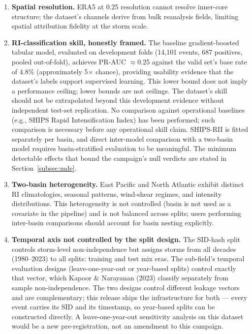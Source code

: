 \documentclass[11pt]{article}
\begin{document}
\begin{enumerate}
  \item \textbf{Spatial resolution.} ERA5 at 0.25\textdegree{} resolution
  cannot resolve inner-core structure; the dataset's channels derive from bulk
  reanalysis fields, limiting spatial attribution fidelity at the storm scale.

  \item \textbf{RI-classification skill, honestly framed.} The baseline
  gradient-boosted tabular model, evaluated on development folds (14{,}101
  events, 687 positives, pooled out-of-fold), achieves PR-AUC $\approx$0.25
  against the valid set's base rate of 4.8\% (approximately 5$\times$ chance),
  providing usability evidence that the dataset's labels support supervised
  learning. This lower bound does not imply a performance ceiling; lower bounds
  are not ceilings. The dataset's skill should not be extrapolated beyond this
  development evidence without independent test-set replication. No comparison
  against operational baselines (e.g., SHIPS Rapid Intensification Index) has
  been performed; such comparison is necessary before any operational skill
  claim. SHIPS-RII is fitted separately per basin, and direct inter-model
  comparison with a two-basin model requires basin-stratified evaluation to be
  meaningful. The minimum detectable effects that bound the campaign's null
  verdicts are stated in Section~\ref{subsec:mde}.

  \item \textbf{Two-basin heterogeneity.} East Pacific and North Atlantic
  exhibit distinct RI climatologies, seasonal patterns, wind-shear regimes, and
  intensity distributions. This heterogeneity is not controlled (basin is not
  used as a covariate in the pipeline) and is not balanced across splits; users
  performing inter-basin comparisons should account for basin nesting
  explicitly.

  \item \textbf{Temporal axis not controlled by the split design.} The SID-hash
  split controls storm-level non-independence but assigns storms from all
  decades (1980--2023) to all splits: training and test mix eras. The
  sub-field's temporal evaluation designs (leave-one-year-out or year-based
  splits) control exactly that vector, which Kapoor \& Narayanan (2023)
  classify separately from sample non-independence. The two designs control
  different leakage vectors and are complementary; this release ships the
  infrastructure for both --- every event carries its SID and its timestamp, so
  year-based splits can be constructed directly. A leave-one-year-out
  sensitivity analysis on this dataset would be a new pre-registration, not an
  amendment to this campaign.


\end{enumerate}
\end{document}

